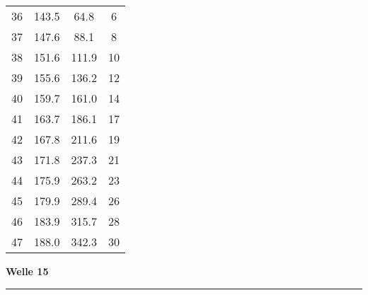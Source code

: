 \documentclass[10pt, a4paper]{article}
\begin{document}
\begin{center}
\begin{tabular}{c|c|c|c}
		36 & 143.5 & 64.8 & 6 \\
		37 & 147.6 & 88.1 & 8 \\
		38 & 151.6 & 111.9 & 10 \\
		39 & 155.6 & 136.2 & 12 \\
		40 & 159.7 & 161.0 & 14 \\
		41 & 163.7 & 186.1 & 17 \\
		42 & 167.8 & 211.6 & 19 \\
		43 & 171.8 & 237.3 & 21 \\
		44 & 175.9 & 263.2 & 23 \\
		45 & 179.9 & 289.4 & 26 \\
		46 & 183.9 & 315.7 & 28 \\
		47 & 188.0 & 342.3 & 30 \\
	\end{tabular}
\end{center}
\newpage
\centerline{{\bf Welle 15} }
\rule{1.0\textwidth}{0.5mm}
\end{document}
